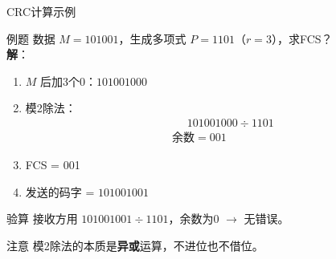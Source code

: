 \documentclass[10pt, aspectratio=169]{beamer}
\begin{document}
\begin{frame}{CRC计算示例}
    \begin{exampleblock}{例题}
        数据 $M = 101001$，生成多项式 $P = 1101$（$r=3$），求FCS？\\
        \textbf{解}：
        \begin{enumerate}
            \item $M$ 后加3个0：$101001000$
            \item 模2除法：
            \begin{align*}
                &\phantom{=}101001000 \div 1101 \\
                &\text{余数} = 001
            \end{align*}
            \item FCS = 001
            \item 发送的码字 = $101001001$
        \end{enumerate}
    \end{exampleblock}
    \vspace{0.3em}
    \begin{exampleblock}{验算}
        接收方用 $101001001 \div 1101$，余数为0 $\to$ 无错误。
    \end{exampleblock}
    \begin{block}{注意}
        模2除法的本质是\textbf{异或}运算，不进位也不借位。
    \end{block}
\end{frame}
\end{document}
